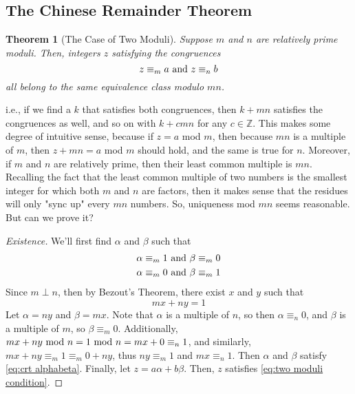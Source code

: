 \documentclass[10pt]{article}
\newcommand\ZZ{{\mathbb Z}}
\newtheorem{theorem}{Theorem}[section]
\theoremstyle{definition}
\begin{document}
\subsection{The Chinese Remainder Theorem}
\begin{theorem}[The Case of Two Moduli]
Suppose $m$ and $n$ are relatively prime moduli.  Then, integers $z$ satisfying the congruences
\begin{equation}\label{eq:two moduli condition} 
z \equiv_m a~\textnormal{and}~z\equiv_n b
\end{equation}
all belong to the same equivalence class modulo $mn$.  
\end{theorem}
i.e., if we find a $k$ that satisfies both congruences, then $k+mn$ satisfies the congruences as well, and so on with $k+cmn$ for any $c\in\ZZ$.  This makes some degree of intuitive sense, because if $z=a$ mod $m$, then because $mn$ is a multiple of $m$, then $z+mn = a$ mod $m$ should hold, and the same is true for $n$.  Moreover, if $m$ and $n$ are relatively prime, then their least common multiple is $mn$.  Recalling the fact that the least common multiple of two numbers is the smallest integer for which both $m$ and $n$ are factors, then it makes sense that the residues will only "sync up" every $mn$ numbers.  So, uniqueness mod $mn$ seems reasonable. But can we prove it? 
\begin{proof}[Existence]
We'll first find $\alpha$ and $\beta$ such that 
\begin{equation}\label{eq:crt alphabeta}
\begin{split}
\alpha \equiv_m 1 \textnormal{~and~}\beta \equiv_m 0 \\
\alpha \equiv_m 0 \textnormal{~and~}\beta \equiv_m 1
\end{split}
\end{equation}
Since $m\perp n$, then by Bezout's Theorem, there exist $x$ and $y$ such that 
\[mx + ny = 1\]
Let $\alpha = ny$ and $\beta = mx$.  Note that $\alpha$ is a multiple of $n$, so then $\alpha \equiv_n 0$, and $\beta$ is a multiple of $m$, so $\beta \equiv_m 0$.  Additionally, $mx + ny\textnormal{~mod~}n= 1\textnormal{~mod~}n = mx+0\equiv_n 1$, and similarly, $mx+ny\equiv_m 1 \equiv_m 0+ny$, thus $ny\equiv_m 1$ and $mx\equiv_n 1$.  Then $\alpha$ and $\beta$ satisfy \ref{eq:crt alphabeta}.  Finally, let $z=a\alpha +b\beta$.  Then, $z$ satisfies \ref{eq:two moduli condition}.
\end{proof}
\end{document}
